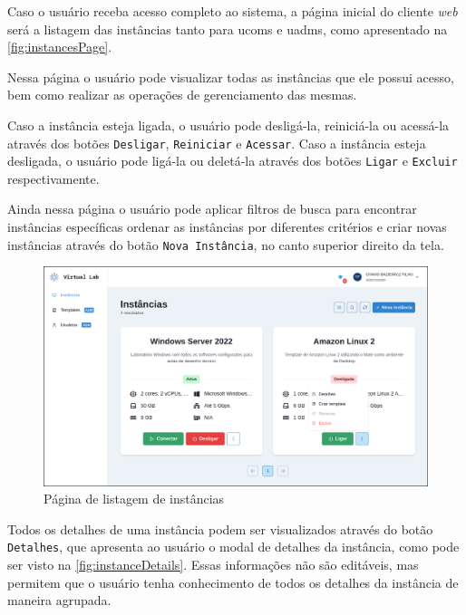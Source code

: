 Caso o usuário receba acesso completo ao sistema, a página inicial do cliente \textit{web} será a listagem das instâncias tanto para \glspl{ucom} e \glspl{uadm}, como apresentado na \autoref{fig:instancesPage}.

Nessa página o usuário pode visualizar todas as instâncias que ele possui acesso, bem como realizar as operações de gerenciamento das mesmas.

Caso a instância esteja ligada, o usuário pode desligá-la, reiniciá-la ou acessá-la através dos botões \texttt{Desligar}, \texttt{Reiniciar} e \texttt{Acessar}. Caso a instância esteja desligada, o usuário pode ligá-la ou deletá-la através dos botões \texttt{Ligar} e \texttt{Excluir} respectivamente. 

Ainda nessa página o usuário pode aplicar filtros de busca para encontrar instâncias específicas ordenar as instâncias por diferentes critérios e criar novas instâncias através do botão \texttt{Nova Instância}, no canto superior direito da tela.

\begin{figure}[H]
\caption{Página de listagem de instâncias}
\label{fig:instancesPage}
\includegraphics[width=\textwidth]{capitulos/3-resultados/files/instances.png}
\end{figure}

Todos os detalhes de uma instância podem ser visualizados através do botão \texttt{Detalhes}, que apresenta ao usuário o modal de detalhes da instância, como pode ser visto na \autoref{fig:instanceDetails}. Essas informações não são editáveis, mas permitem que o usuário tenha conhecimento de todos os detalhes da instância de maneira agrupada.

